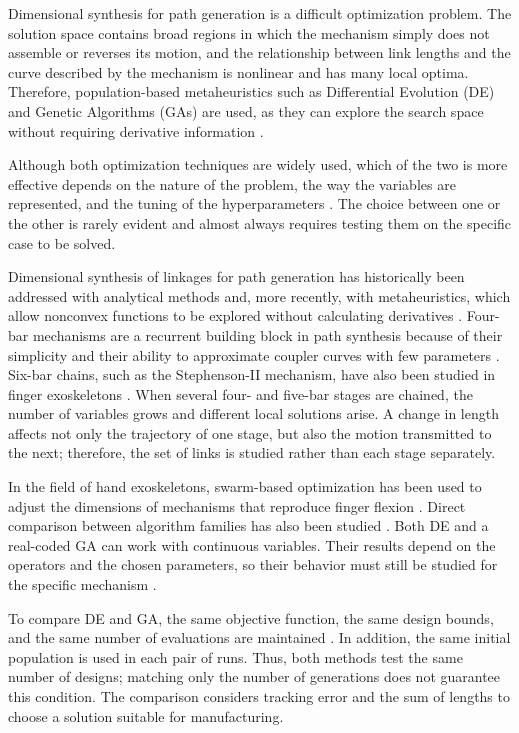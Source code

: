 \documentclass[conference,letterpaper]{IEEEtran}
\begin{document}
Dimensional synthesis for path generation is a difficult optimization problem. The solution space contains broad regions in which the mechanism simply does not assemble or reverses its motion, and the relationship between link lengths and the curve described by the mechanism is nonlinear and has many local optima. Therefore, population-based metaheuristics such as Differential Evolution (DE) and Genetic Algorithms (GAs) are used, as they can explore the search space without requiring derivative information \cite{r4,r5}.

Although both optimization techniques are widely used, which of the two is more effective depends on the nature of the problem, the way the variables are represented, and the tuning of the hyperparameters \cite{r6,r7}. The choice between one or the other is rarely evident and almost always requires testing them on the specific case to be solved.

Dimensional synthesis of linkages for path generation has historically been addressed with analytical methods and, more recently, with metaheuristics, which allow nonconvex functions to be explored without calculating derivatives \cite{r4,r5}. Four-bar mechanisms are a recurrent building block in path synthesis because of their simplicity and their ability to approximate coupler curves with few parameters \cite{r4,r5}. Six-bar chains, such as the Stephenson-II mechanism, have also been studied in finger exoskeletons \cite{r8}. When several four- and five-bar stages are chained, the number of variables grows and different local solutions arise. A change in length affects not only the trajectory of one stage, but also the motion transmitted to the next; therefore, the set of links is studied rather than each stage separately.

In the field of hand exoskeletons, swarm-based optimization has been used to adjust the dimensions of mechanisms that reproduce finger flexion \cite{r8}. Direct comparison between algorithm families has also been studied \cite{r6,r7}. Both DE and a real-coded GA can work with continuous variables. Their results depend on the operators and the chosen parameters, so their behavior must still be studied for the specific mechanism \cite{r9,r10}.

To compare DE and GA, the same objective function, the same design bounds, and the same number of evaluations are maintained \cite{r6,r17}. In addition, the same initial population is used in each pair of runs. Thus, both methods test the same number of designs; matching only the number of generations does not guarantee this condition. The comparison considers tracking error and the sum of lengths to choose a solution suitable for manufacturing.
\end{document}
